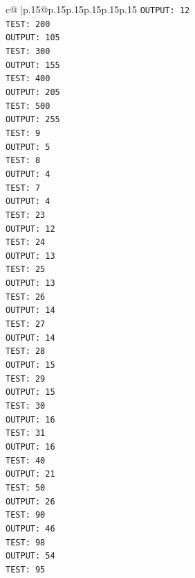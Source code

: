 \documentclass{article}
\begin{document}
{\begin{supertabular}{c@{$\;$}|p{.15\linewidth}@{}p{.15\linewidth}p{.15\linewidth}p{.15\linewidth}p{.15\linewidth}p{.15\linewidth}}
{{{\texttt{OUTPUT: 12} \\
\texttt{TEST: 200} \\
\texttt{OUTPUT: 105} \\
\texttt{TEST: 300} \\
\texttt{OUTPUT: 155} \\
\texttt{TEST: 400} \\
\texttt{OUTPUT: 205} \\
\texttt{TEST: 500} \\
\texttt{OUTPUT: 255} \\
\texttt{TEST: 9} \\
\texttt{OUTPUT: 5} \\
\texttt{TEST: 8} \\
\texttt{OUTPUT: 4} \\
\texttt{TEST: 7} \\
\texttt{OUTPUT: 4} \\
\texttt{TEST: 23} \\
\texttt{OUTPUT: 12} \\
\texttt{TEST: 24} \\
\texttt{OUTPUT: 13} \\
\texttt{TEST: 25} \\
\texttt{OUTPUT: 13} \\
\texttt{TEST: 26} \\
\texttt{OUTPUT: 14} \\
\texttt{TEST: 27} \\
\texttt{OUTPUT: 14} \\
\texttt{TEST: 28} \\
\texttt{OUTPUT: 15} \\
\texttt{TEST: 29} \\
\texttt{OUTPUT: 15} \\
\texttt{TEST: 30} \\
\texttt{OUTPUT: 16} \\
\texttt{TEST: 31} \\
\texttt{OUTPUT: 16} \\
\texttt{TEST: 40} \\
\texttt{OUTPUT: 21} \\
\texttt{TEST: 50} \\
\texttt{OUTPUT: 26} \\
\texttt{TEST: 90} \\
\texttt{OUTPUT: 46} \\
\texttt{TEST: 98} \\
\texttt{OUTPUT: 54} \\
\texttt{TEST: 95} \\
}}}
\end{supertabular}}
\end{document}
